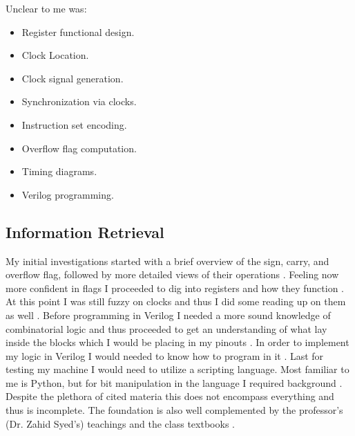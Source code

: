 \documentclass{article}
\begin{document}
\noindent
Unclear to me was:
\begin{itemize}
    \item[\(\diamond\)] Register functional design.
    \item[\(\diamond\)] Clock Location.
    \item[\(\diamond\)] Clock signal generation.
    \item[\(\diamond\)] Synchronization via clocks.
    \item[\(\diamond\)] Instruction set encoding.
    \item[\(\diamond\)] Overflow flag computation.
    \item[\(\diamond\)] Timing diagrams.
    \item[\(\diamond\)] Verilog programming.
\end{itemize}

\subsection{Information Retrieval}
My initial investigations started with a brief overview of the sign, carry, and overflow flag, followed by more detailed views of their operations \cite{stack_binof, ebsmadl_ofs, stack_carry, wiki_negflag, wiki_ovfflag}.
Feeling now more confident in flags I proceeded to dig into registers and how they function \cite{neso_diff, neso_srlatch, neso_triggering}.
At this point I was still fuzzy on clocks and thus I did some reading up on them as well \cite{stack_ieclk, neso_clk, stack_oscii, wiki_clock}.
Before programming in Verilog I needed a more sound knowledge of combinatorial logic and thus proceeded to get an understanding of what lay inside the blocks which I would be placing in my pinouts \cite{et_binadd, et_binsub, et_combilog, et_digtcomp, et_demultiplex, et_multiplex, icacuk}.
In order to implement my logic in Verilog I would needed to know how to program in it \cite{coursera_fpga, rtd_fpga}.
Last for testing my machine I would need to utilize a scripting language.
Most familiar to me is Python, but for bit manipulation in the language I required background \cite{geeks_twos, stack_twos, pywiki_bit, stack_logitwos, geeks_ones}.
Despite the plethora of cited materia this does not encompass everything and thus is incomplete.
The foundation is also well complemented by the professor's (Dr. Zahid Syed's) teachings and the class textbooks \cite{Bryant, Hennessy}.
\end{document}
